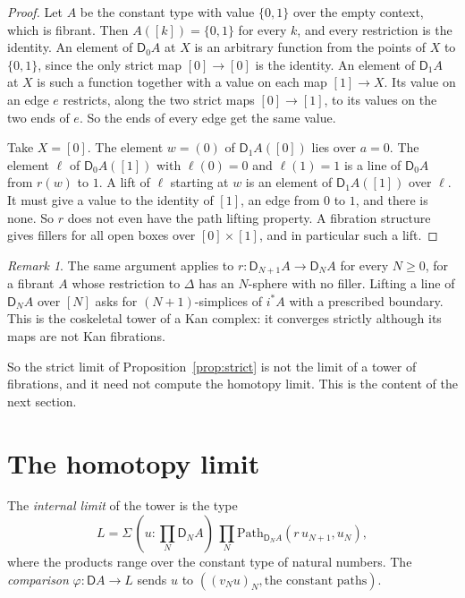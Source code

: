 \documentclass[11pt]{article}
\newcommand{\Path}{\mathrm{Path}}
\newcommand{\D}{\mathsf{D}}
\theoremstyle{plain}
\theoremstyle{definition}
\theoremstyle{remark}
\newtheorem{remark}[theorem]{Remark}
\begin{document}
\begin{proof}
Let $A$ be the constant type with value $\{0,1\}$ over the empty context,
which is fibrant. Then $A([k])=\{0,1\}$ for every $k$, and every
restriction is the identity. An element of $\D_0A$ at $X$ is an arbitrary
function from the points of $X$ to $\{0,1\}$, since the only strict map
$[0]\to[0]$ is the identity. An element of $\D_1A$ at $X$ is such a
function together with a value on each map $[1]\to X$. Its value on an
edge $e$ restricts, along the two strict maps $[0]\to[1]$, to its values on
the two ends of $e$. So the ends of every edge get the same value.

Take $X=[0]$. The element $w=(0)$ of $\D_1A([0])$ lies over $a=0$. The
element $\ell$ of $\D_0A([1])$ with $\ell(0)=0$ and $\ell(1)=1$ is a line
of $\D_0A$ from $r(w)$ to $1$. A lift of $\ell$ starting at $w$ is an
element of $\D_1A([1])$ over $\ell$. It must give a value to the identity
of $[1]$, an edge from $0$ to $1$, and there is none. So $r$ does not even
have the path lifting property. A fibration structure gives fillers for
all open boxes over $[0]\times[1]$, and in particular such a lift.
\end{proof}

\begin{remark}
The same argument applies to $r:\D_{N+1}A\to\D_NA$ for every $N\ge0$, for a
fibrant $A$ whose restriction to $\Delta$ has an $N$-sphere with no
filler. Lifting a line of $\D_NA$ over $[N]$ asks for $(N+1)$-simplices of
$i^*A$ with a prescribed boundary. This is the coskeletal tower of a Kan
complex: it converges strictly although its maps are not Kan fibrations.
\end{remark}

So the strict limit of Proposition~\ref{prop:strict} is not the limit of a
tower of fibrations, and it need not compute the homotopy limit. This is
the content of the next section.

\section{The homotopy limit}\label{sec:hlim}

The \emph{internal limit} of the tower is the type
\[
L=\Sigma\,(u:\textstyle\prod_N\D_NA)\,\prod_N\Path_{\D_NA}(r\,u_{N+1},u_N),
\]
where the products range over the constant type of natural numbers. The
\emph{comparison} $\varphi:\D A\to L$ sends $u$ to $((v_Nu)_N,\text{the
constant paths})$.
\end{document}
